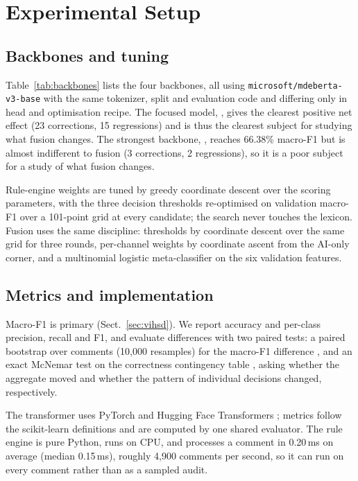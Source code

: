 \section{Experimental Setup}
\label{sec:setup}

\subsection{Backbones and tuning}
\label{sec:backbones}

Table~\ref{tab:backbones} lists the four backbones, all using
\texttt{microsoft/mdeberta-v3-base} with the same tokenizer, split and evaluation
code and differing only in head and optimisation recipe. The focused model,
, gives the clearest positive net effect (23 corrections,
15 regressions) and is thus the clearest subject for studying what fusion changes.
The strongest backbone, , reaches
66.38\% macro-F1 but is almost indifferent to fusion (3 corrections, 2 regressions),
so it is a poor subject for a study of what fusion changes.



Rule-engine weights are tuned by greedy coordinate descent over the scoring
parameters, with the three decision thresholds re-optimised on validation macro-F1
over a 101-point grid at every candidate; the search never touches the lexicon. Fusion
uses the same discipline: thresholds by coordinate descent over the same grid for three
rounds, per-channel weights by coordinate ascent from the AI-only corner, and a
multinomial logistic meta-classifier on the six validation features.

\subsection{Metrics and implementation}
\label{sec:metrics}

Macro-F1 is primary (Sect.~\ref{sec:vihsd}). We report accuracy and per-class
precision, recall and F1, and evaluate differences with two paired tests: a paired
bootstrap over comments (10{,}000 resamples) for the macro-F1 difference
\cite{efron1993bootstrap}, and an exact McNemar test on the correctness contingency
table \cite{mcnemar1947note}, asking whether the aggregate moved and whether the
pattern of individual decisions changed, respectively.

The transformer uses PyTorch and Hugging Face Transformers
\cite{wolf2020transformers}; metrics follow the scikit-learn definitions and are
computed by one shared evaluator. The rule engine is pure
Python, runs on CPU, and processes a comment in 0.20\,ms on average (median 0.15\,ms),
roughly 4{,}900 comments per second, so it can run on every comment rather than as
a sampled audit.

